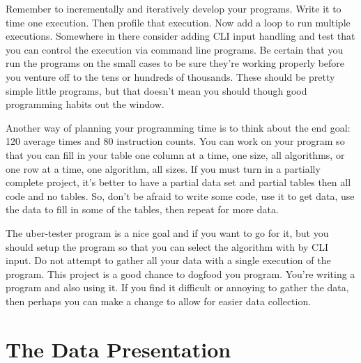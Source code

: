\documentclass[]{tufte-handout}
\begin{document}
Remember to incrementally and iteratively develop your programs. Write it to time one execution. Then profile that execution. Now add a loop to run multiple executions. Somewhere in there consider adding CLI input handling and test that you can control the execution via command line programs. Be certain that you run the programs on the small cases to be sure they're working properly before you venture off to the tens or hundreds of thousands. These should be pretty simple little programs, but that doesn't mean you should though good programming habits out the window. 

Another way of planning your programming time is to think about the end goal: 120 average times and 80 instruction counts. You can work on your program so that you can fill in your table one column at a time, one size, all algorithms, or one row at a time, one algorithm, all sizes.  If you must turn in a partially complete project, it's better to have a partial data set and partial tables then all code and no tables. So, don't be afraid to write some code, use it to get data, use the data to fill in some of the tables, then repeat for more data.

The uber-tester program is a nice goal and if you want to go for it, but you should setup the program so that you can select the algorithm with by CLI input. Do not attempt to gather all your data with a single execution of the program. This project is a good chance to dogfood you program. You're writing a program and also using it. If you find it difficult or annoying to gather the data, then perhaps you can make a change to allow for easier data collection.


\section{The Data Presentation}
\end{document}
